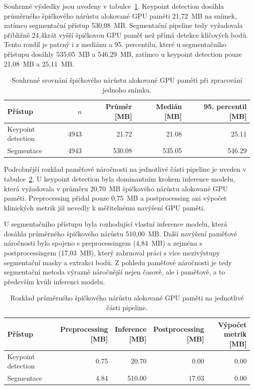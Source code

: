 \documentclass[male,czech,api_bc]{kitheses}
\begin{document}
Souhrnné výsledky jsou uvedeny v tabulce~\ref{tab:memory_total}. Keypoint detection dosáhla průměrného špičkového nárůstu alokované GPU paměti 21{,}72~MB na snímek, zatímco segmentační přístup 530{,}08~MB. Segmentační pipeline tedy vyžadovala přibližně 24{,}4krát vyšší špičkovou GPU paměť než přímá detekce klíčových bodů. Tento rozdíl je patrný i z mediánu a 95. percentilu, které u segmentačního přístupu dosáhly 535{,}05~MB a 546{,}29~MB, zatímco u keypoint detection pouze 21{,}08~MB a 25{,}11~MB.

\begin{table}[htbp]
\centering
\caption{Souhrnné srovnání špičkového nárůstu alokované GPU paměti při zpracování jednoho snímku.}
\label{tab:memory_total}
\begin{tabular}{lrrrr}
\hline
Přístup & $n$ & Průměr [MB] & Medián [MB] & 95. percentil [MB] \\
\hline
Keypoint detection & 4943 & 21.72 & 21.08 & 25.11 \\
Segmentace & 4943 & 530.08 & 535.05 & 546.29 \\
\hline
\end{tabular}
\end{table}

Podrobnější rozklad paměťové náročnosti na jednotlivé části pipeline je uveden v tabulce~\ref{tab:memory_breakdown}. U keypoint detection byla dominantním krokem inference modelu, která vyžadovala v průměru 20{,}70~MB špičkového nárůstu alokované GPU paměti. Preprocessing přidal pouze 0{,}75~MB a postprocessing ani výpočet klinických metrik již nevedly k měřitelnému navýšení GPU paměti.

U segmentačního přístupu byla rozhodující vlastní inference modelu, která dosáhla průměrného špičkového nárůstu 510{,}00~MB. Další navýšení paměťové náročnosti bylo spojeno s preprocessingem (4{,}84~MB) a zejména s postprocessingem (17{,}03~MB), který zahrnoval práci s více mezivýstupy segmentační masky a extrakci bodů. Z pohledu paměťové náročnosti je tedy segmentační metoda výrazně náročnější nejen časově, ale i paměťově, a to především kvůli inferenci modelu.

\begin{table}[htbp]
\centering
\caption{Rozklad průměrného špičkového nárůstu alokované GPU paměti na jednotlivé části pipeline.}
\label{tab:memory_breakdown}
\begin{tabular}{lrrrr}
\hline
Přístup & \shortstack{Preprocessing\\{[MB]}} & \shortstack{Inference\\{[MB]}} & \shortstack{Postprocessing\\{[MB]}} & \shortstack{Výpočet\\metrik {[MB]}} \\
\hline
Keypoint detection & 0.75 & 20.70 & 0.00 & 0.00 \\
Segmentace & 4.84 & 510.00 & 17.03 & 0.00 \\
\hline
\end{tabular}
\end{table}
\end{document}
